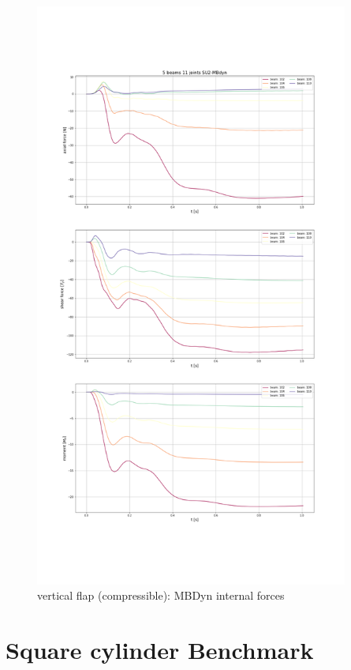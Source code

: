\begin{figure}[htbp!]
	\centering
	\includegraphics[width=0.92\textwidth, trim=0 230 0 230, clip]{images/comp_flap/vert-flap_SU2-MBDyn_act.png}
	\caption{vertical flap (compressible): MBDyn internal forces}
	\label{fig:comp_mbd_internal}
\end{figure}


\newpage


\section{Square cylinder Benchmark}
\label{sec:sq-cyl-bench}


